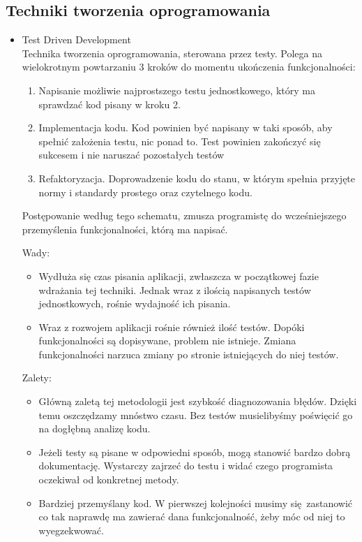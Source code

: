   \subsection{Techniki tworzenia oprogramowania}
    \begin{itemize}
      \item Test Driven Development\cite{tdd} \\
        Technika tworzenia oprogramowania, sterowana przez testy. Polega na wielokrotnym powtarzaniu 3 kroków do momentu ukończenia funkcjonalności:
        \begin{enumerate}
          \item Napisanie możliwie najprostszego testu jednostkowego, który ma sprawdzać kod pisany w kroku 2.
          \item Implementacja kodu. Kod powinien być napisany w taki sposób, aby spełnić założenia testu, nic ponad to. Test powinien zakończyć się sukcesem i nie naruszać pozostałych testów
          \item Refaktoryzacja. Doprowadzenie kodu do stanu, w którym spełnia przyjęte normy i standardy prostego oraz czytelnego kodu\cite{scs}.
        \end{enumerate}

        Postępowanie według tego schematu, zmusza programistę do wcześniejszego przemyślenia funkcjonalności, którą ma napisać.

        Wady:
        \begin{itemize}
          \item Wydłuża się czas pisania aplikacji, zwłaszcza w początkowej fazie wdrażania tej techniki. Jednak wraz z ilością napisanych testów jednostkowych, rośnie wydajność ich pisania.
          \item Wraz z rozwojem aplikacji rośnie również ilość testów. Dopóki funkcjonalności są dopisywane, problem nie istnieje. Zmiana funkcjonalności narzuca zmiany po stronie istniejących do niej testów.
        \end{itemize}

        Zalety:
        \begin{itemize}
          \item Główną zaletą tej metodologii jest szybkość diagnozowania błędów. Dzięki temu oszczędzamy mnóstwo czasu. Bez testów musielibyśmy poświęcić go na dogłębną analizę kodu.
          \item Jeżeli testy są pisane w odpowiedni sposób, mogą stanowić bardzo dobrą dokumentację. Wystarczy zajrzeć do testu i widać czego programista oczekiwał od konkretnej metody.
          \item Bardziej przemyślany kod. W pierwszej kolejności musimy się zastanowić co tak naprawdę ma zawierać dana funkcjonalność, żeby móc od niej to wyegzekwować.
        \end{itemize}


\end{itemize}
